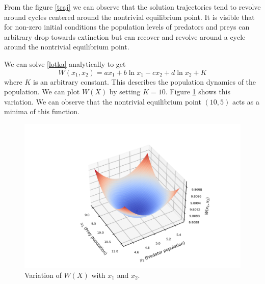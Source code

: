 \documentclass{article}
\begin{document}
From the figure \ref{traj} we can observe that the solution trajectories tend to revolve around cycles centered around the nontrivial equilibrium point. It is visible that for non-zero initial conditions the population levels of predators and preys can arbitrary drop towards extinction but can recover and revolve around a cycle around the nontrivial equilibrium point. 

We can solve \eqref{lotka} analytically to get
$$W(x_1,x_2) = ax_1+b\ln{x_1}-cx_2+d\ln{x_2}+K$$
where $K$ is an arbitrary constant. This describes the population dynamics of the population. We can plot $W(X)$ by setting $K=10$. Figure \ref{W} shows this variation. We can observe that the nontrivial equilibrium point $(10,5)$ acts as a minima of this function. 

\begin{figure}[h]
\centering
\includegraphics[scale=0.75]{images/larger_plot.png}
\caption{Variation of $W(X)$ with $x_1$ and $x_2$.}
\label{W}
\end{figure}

\nocite{*}


\end{document}
